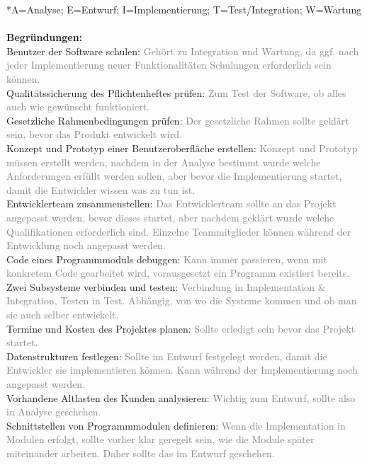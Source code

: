 \documentclass[a4paper,11pt]{scrartcl}
\begin{document}
	*A=Analyse; E=Entwurf; I=Implementierung; T=Test/Integration; W=Wartung\\
	\\\textbf{Begründungen:}\\
	Benutzer der Software schulen: \textcolor{gray}{Gehört zu Integration und Wartung, da ggf. nach jeder Implementierung neuer Funktionalitäten Schulungen erforderlich sein können.}\\
	Qualitätssicherung des Pflichtenheftes prüfen: \textcolor{gray}{Zum Test der Software, ob alles auch wie gewünscht funktioniert.}\\
	Gesetzliche Rahmenbedingungen prüfen: \textcolor{gray}{Der gesetzliche Rahmen sollte geklärt sein, bevor das Produkt entwickelt wird.}\\
	Konzept und Prototyp einer Benutzeroberfläche erstellen: \textcolor{gray}{Konzept und Prototyp müssen erstellt werden, nachdem in der Analyse bestimmt wurde welche Anforderungen erfüllt werden sollen, aber bevor die Implementierung startet, damit die Entwickler wissen was zu tun ist.} \\
	Entwicklerteam zusammenstellen: \textcolor{gray}{Das Entwicklerteam sollte an das Projekt angepasst werden, bevor dieses startet, aber nachdem geklärt wurde welche Qualifikationen erforderlich sind. Einzelne Teammitglieder können während der Entwicklung noch angepasst werden.}\\
	Code eines Programmmoduls debuggen: \textcolor{gray}{Kann immer passieren, wenn mit konkretem Code gearbeitet wird, vorausgesetzt ein Programm existiert bereits.}\\			
 	Zwei Subsysteme verbinden und testen: \textcolor{gray}{Verbindung in Implementation \& Integration, Testen in Test. Abhängig, von wo die Systeme kommen und ob man sie auch selber entwickelt.}\\			
 	Termine und Kosten des Projektes planen: \textcolor{gray}{Sollte erledigt sein bevor das Projekt startet.}\\		
	Datenstrukturen festlegen: \textcolor{gray}{Sollte im Entwurf festgelegt werden, damit die Entwickler sie implementieren können. Kann während der Implementierung noch angepasst werden.}\\				
	Vorhandene Altlasten des Kunden analysieren: \textcolor{gray}{Wichtig zum Entwurf, sollte also in Analyse geschehen.}\\			
	Schnittstellen von Programmmodulen definieren: \textcolor{gray}{Wenn die Implementation in Modulen erfolgt, sollte vorher klar geregelt sein, wie die Module später miteinander arbeiten. Daher sollte das im Entwurf geschehen.}\\			
\end{document}
